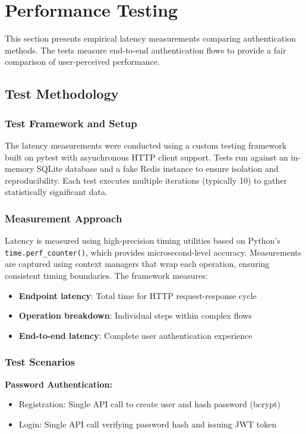 \section{Performance Testing}\label{sec:performance}

This section presents empirical latency measurements comparing  authentication methods. The tests measure end-to-end authentication flows to provide a fair comparison of user-perceived performance.

\subsection{Test Methodology}

\subsubsection{Test Framework and Setup}
The latency measurements were conducted using a custom testing framework built on pytest with asynchronous HTTP client support. Tests run against an in-memory SQLite database and a fake Redis instance to ensure isolation and reproducibility. Each test executes multiple iterations (typically 10) to gather statistically significant data.

\subsubsection{Measurement Approach}
Latency is measured using high-precision timing utilities based on Python's \texttt{time.perf\_counter()}, which provides microsecond-level accuracy. Measurements are captured using context managers that wrap each operation, ensuring consistent timing boundaries. The framework measures:

\begin{itemize}
    \item \textbf{Endpoint latency}: Total time for HTTP request-response cycle
    \item \textbf{Operation breakdown}: Individual steps within complex flows
    \item \textbf{End-to-end latency}: Complete user authentication experience
\end{itemize}

\subsubsection{Test Scenarios}

\textbf{Password Authentication:}
\begin{itemize}
    \item Registration: Single API call to create user and hash password (bcrypt)
    \item Login: Single API call verifying password hash and issuing JWT token
\end{itemize}

